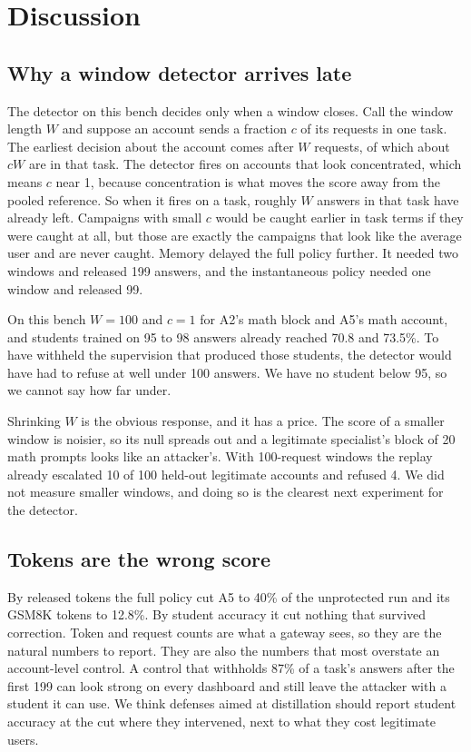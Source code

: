 \documentclass[journal]{IEEEtran}
\begin{document}
\section{Discussion}
\label{sec:discussion}
\subsection{Why a window detector arrives late}
The detector on this bench decides only when a window closes. Call the window length $W$ and suppose an account sends a fraction $c$ of its requests in one task. The earliest decision about the account comes after $W$ requests, of which about $cW$ are in that task. The detector fires on accounts that look concentrated, which means $c$ near 1, because concentration is what moves the score away from the pooled reference. So when it fires on a task, roughly $W$ answers in that task have already left. Campaigns with small $c$ would be caught earlier in task terms if they were caught at all, but those are exactly the campaigns that look like the average user and are never caught. Memory delayed the full policy further. It needed two windows and released 199 answers, and the instantaneous policy needed one window and released 99.

On this bench $W=100$ and $c=1$ for A2's math block and A5's math account, and students trained on 95 to 98 answers already reached 70.8 and 73.5\%. To have withheld the supervision that produced those students, the detector would have had to refuse at well under 100 answers. We have no student below 95, so we cannot say how far under.

Shrinking $W$ is the obvious response, and it has a price. The score of a smaller window is noisier, so its null spreads out and a legitimate specialist's block of 20 math prompts looks like an attacker's. With 100-request windows the replay already escalated 10 of 100 held-out legitimate accounts and refused 4. We did not measure smaller windows, and doing so is the clearest next experiment for the detector.

\subsection{Tokens are the wrong score}
By released tokens the full policy cut A5 to 40\% of the unprotected run and its GSM8K tokens to 12.8\%. By student accuracy it cut nothing that survived correction. Token and request counts are what a gateway sees, so they are the natural numbers to report. They are also the numbers that most overstate an account-level control. A control that withholds 87\% of a task's answers after the first 199 can look strong on every dashboard and still leave the attacker with a student it can use. We think defenses aimed at distillation should report student accuracy at the cut where they intervened, next to what they cost legitimate users.
\end{document}
